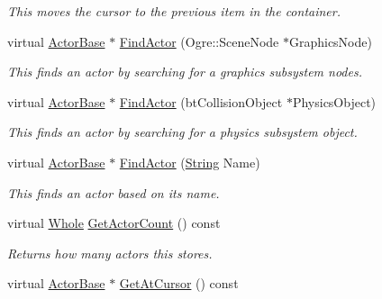 \begin{DoxyCompactItemize}
\begin{DoxyCompactList}\small\item\em This moves the cursor to the previous item in the container. \item\end{DoxyCompactList}\item 
virtual \hyperlink{classMezzanine_1_1ActorBase}{ActorBase} $\ast$ \hyperlink{classMezzanine_1_1ActorContainerVector_a0155ddbb599b1653c37bdfcb261355d2}{FindActor} (Ogre::SceneNode $\ast$GraphicsNode)
\begin{DoxyCompactList}\small\item\em This finds an actor by searching for a graphics subsystem nodes. \item\end{DoxyCompactList}\item 
virtual \hyperlink{classMezzanine_1_1ActorBase}{ActorBase} $\ast$ \hyperlink{classMezzanine_1_1ActorContainerVector_acc1507a3a9d464ff0c343786986bef98}{FindActor} (btCollisionObject $\ast$PhysicsObject)
\begin{DoxyCompactList}\small\item\em This finds an actor by searching for a physics subsystem object. \item\end{DoxyCompactList}\item 
virtual \hyperlink{classMezzanine_1_1ActorBase}{ActorBase} $\ast$ \hyperlink{classMezzanine_1_1ActorContainerVector_a09837c17229c0a17031e7ce5fa3f6fc6}{FindActor} (\hyperlink{namespaceMezzanine_acf9fcc130e6ebf08e3d8491aebcf1c86}{String} Name)
\begin{DoxyCompactList}\small\item\em This finds an actor based on its name. \item\end{DoxyCompactList}\item 
virtual \hyperlink{namespaceMezzanine_adcbb6ce6d1eb4379d109e51171e2e493}{Whole} \hyperlink{classMezzanine_1_1ActorContainerVector_a9a4e61bb6597fb66906c779c1f27e051}{GetActorCount} () const 
\begin{DoxyCompactList}\small\item\em Returns how many actors this stores. \item\end{DoxyCompactList}\item 
virtual \hyperlink{classMezzanine_1_1ActorBase}{ActorBase} $\ast$ \hyperlink{classMezzanine_1_1ActorContainerVector_ac9efeefbc35033294723d33a8edd72c2}{GetAtCursor} () const 

\end{DoxyCompactItemize}
